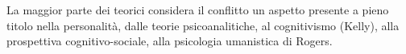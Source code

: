 \documentclass{subfiles}
\begin{document}
La maggior parte dei teorici considera il conflitto un aspetto presente a pieno titolo nella personalità, dalle teorie
psicoanalitiche, al cognitivismo (Kelly), alla prospettiva cognitivo-sociale, alla psicologia umanistica di Rogers.\\
\end{document}
